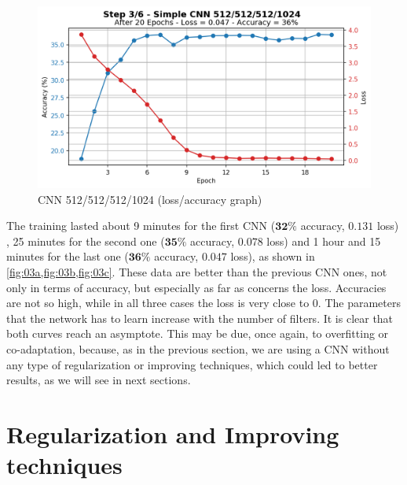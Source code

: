 \documentclass[a4paper, 11pt]{article}
\begin{document}
	\begin{figure}[ht!]
		\centering
		\includegraphics[width=0.6\paperwidth]{img/fig03c.png}
		\caption{CNN 512/512/512/1024 (loss/accuracy graph)}
		\label{fig:03c}
	\end{figure}
	
	The training lasted about 9 minutes for the first CNN ($\boldsymbol{32\%}$ accuracy, $\boldsymbol{0.131}$ loss)  , 25 minutes for the second one ($\boldsymbol{35\%}$ accuracy, $\boldsymbol{0.078}$ loss) and 1 hour and 15 minutes for the last one ($\boldsymbol{36\%}$ accuracy, $\boldsymbol{0.047}$ loss), as shown in \vref{fig:03a,fig:03b,fig:03c}.
	These data are better than the previous CNN ones, not only in terms of accuracy, but especially as far as concerns the loss. Accuracies are not so high, while in all three cases the loss is very close to $0$. The parameters that the network has to learn increase with the number of filters. It is clear that both curves reach an asymptote.  
	This may be due, once again, to overfitting or co-adaptation, because, as in the previous section,  we are using a CNN without any type of regularization or improving techniques, which could led to better results, as we will see in next sections.
		
	\FloatBarrier
	
	\section{Regularization and Improving techniques}
		
	
	
	
	
	
\end{document}
